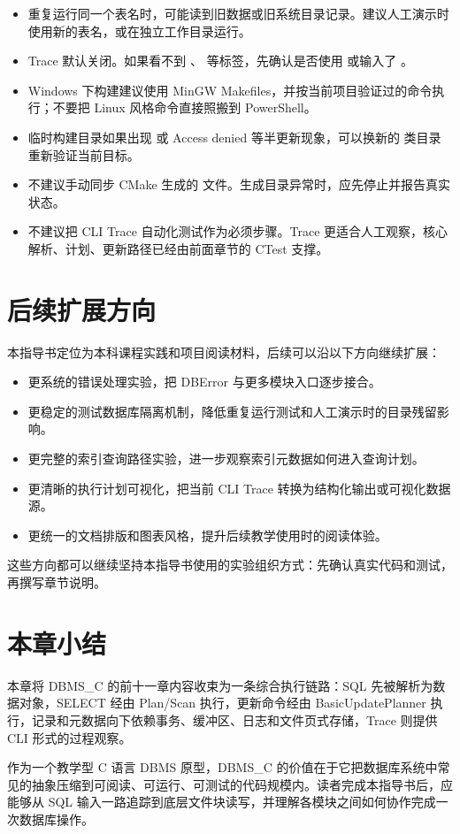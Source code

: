 \begin{itemize}
  \item 重复运行同一个表名时，可能读到旧数据或旧系统目录记录。建议人工演示时使用新的表名，或在独立工作目录运行。
  \item Trace 默认关闭。如果看不到 、 等标签，先确认是否使用  或输入了 。
  \item Windows 下构建建议使用 MinGW Makefiles，并按当前项目验证过的命令执行；不要把 Linux 风格命令直接照搬到 PowerShell。
  \item 临时构建目录如果出现  或 Access denied 等半更新现象，可以换新的  类目录重新验证当前目标。
  \item 不建议手动同步 CMake 生成的  文件。生成目录异常时，应先停止并报告真实状态。
  \item 不建议把 CLI Trace 自动化测试作为必须步骤。Trace 更适合人工观察，核心解析、计划、更新路径已经由前面章节的 CTest 支撑。
\end{itemize}

\section{后续扩展方向}

本指导书定位为本科课程实践和项目阅读材料，后续可以沿以下方向继续扩展：

\begin{itemize}
  \item 更系统的错误处理实验，把 DBError 与更多模块入口逐步接合。
  \item 更稳定的测试数据库隔离机制，降低重复运行测试和人工演示时的目录残留影响。
  \item 更完整的索引查询路径实验，进一步观察索引元数据如何进入查询计划。
  \item 更清晰的执行计划可视化，把当前 CLI Trace 转换为结构化输出或可视化数据源。
  \item 更统一的文档排版和图表风格，提升后续教学使用时的阅读体验。
\end{itemize}

这些方向都可以继续坚持本指导书使用的实验组织方式：先确认真实代码和测试，再撰写章节说明。

\section{本章小结}

本章将 DBMS\_C 的前十一章内容收束为一条综合执行链路：SQL 先被解析为数据对象，SELECT 经由 Plan/Scan 执行，更新命令经由 BasicUpdatePlanner 执行，记录和元数据向下依赖事务、缓冲区、日志和文件页式存储，Trace 则提供 CLI 形式的过程观察。

作为一个教学型 C 语言 DBMS 原型，DBMS\_C 的价值在于它把数据库系统中常见的抽象压缩到可阅读、可运行、可测试的代码规模内。读者完成本指导书后，应能够从 SQL 输入一路追踪到底层文件块读写，并理解各模块之间如何协作完成一次数据库操作。
